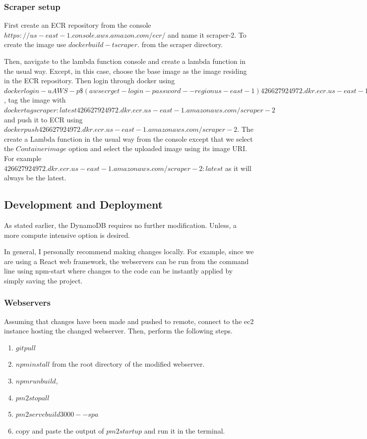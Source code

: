 \documentclass[12pt]{article}
\begin{document}
\subsubsection{Scraper setup}

First create an ECR repository from the console $https://us-east-1.console.aws.amazon.com/ecr/$ and name it scraper-2. To create the image use $docker build -t scraper .$ from the scraper directory. 

Then, navigate to the lambda function console and create a lambda function in the usual way. Except, in this case, choose the base image as the image residing in the ECR repository. Then login through docker using $docker login -u AWS -p \$(aws ecr get-login-password --region us-east-1) 426627924972.dkr.ecr.us-east-1.amazonaws.com$, tag the image with $docker tag scraper:latest 426627924972.dkr.ecr.us-east-1.amazonaws.com/scraper-2$ and push it to ECR using $docker push 426627924972.dkr.ecr.us-east-1.amazonaws.com/scraper-2$. 
The create a Lambda function in the usual way from the console except that we select the $Container image$ option and select the uploaded image using its image URI. For example $426627924972.dkr.ecr.us-east-1.amazonaws.com/scraper-2:latest$ as it will always be the latest.

\subsection{Development and Deployment}

As stated earlier, the DynamoDB requires no further modification. Unless, a more compute intensive option is desired.

In general, I personally recommend making changes locally. For example, since we are using a React web framework, the webservers can be run from the command line using npm-start where changes to the code can be instantly applied by simply saving the project. 

\subsubsection{Webservers}

Assuming that changes have been made and pushed to remote, connect to the ec2 instance hosting the changed webserver. Then, perform the following steps.

\begin{enumerate}
    \item $git pull$
    \item $npm install$ from the root directory of the modified webserver.
    \item $npm run build$,
    \item $pm2 stop all$
    \item $pm2 serve build 3000 --spa$ 
    \item copy and paste the output of $pm2 startup$ and run it in the terminal.
\end{enumerate}
\end{document}
